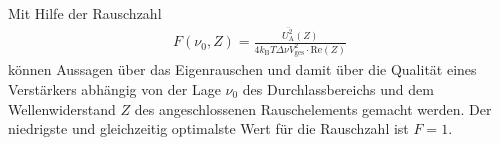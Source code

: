 Mit Hilfe der Rauschzahl
\begin{align}
  F(\nu_0,Z) = \frac{\overline{U_\text{A}^2}(Z)}{4 k_\text{B} T \Delta \nu V_\text{ges}^2 \cdot \text{Re}(Z)}
\end{align}
können Aussagen über das Eigenrauschen und damit über die Qualität eines Verstärkers abhängig von der
Lage $\nu_0$ des Durchlassbereichs und dem Wellenwiderstand $Z$ des angeschlossenen Rauschelements gemacht werden.
Der niedrigste und gleichzeitig optimalste Wert für die Rauschzahl ist $F = 1$.




\cite{anleitung}
